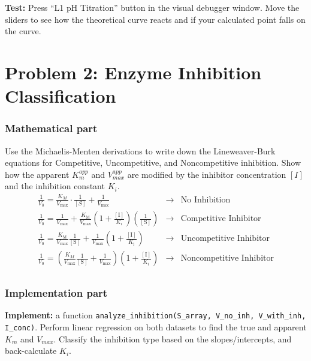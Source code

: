 \documentclass[11pt]{article}
\begin{document}
\textbf{Test:} Press ``L1 pH Titration'' button in the visual debugger window. Move the sliders to see how the theoretical curve reacts and if your calculated point falls on the curve.

\section*{Problem 2: Enzyme Inhibition Classification}

\subsubsection*{Mathematical part}
Use the Michaelis-Menten derivations to write down the Lineweaver-Burk equations for Competitive, Uncompetitive, and Noncompetitive inhibition. Show how the apparent $K_m^{app}$ and $V_{max}^{app}$ are modified by the inhibitor concentration $[I]$ and the inhibition constant $K_i$.
$$
\begin{aligned}
\frac{1}{V_0} = \frac{K_M}{V_{\text{max}}} \cdot \frac{1}{[S]} + \frac{1}{V_{\text{max}}} & \rightarrow & \text{No Inhibition}\\
\frac{1}{V_0} = \frac{1}{V_{\text{max}}} + \frac{K_{\text{M}}}{V_{\text{max}}} \left( 1 + \frac{[\text{I}]}{K_i} \right) \left( \frac{1}{[\text{S}]} \right) & \rightarrow & \text{Competitive Inhibitor}\\
\frac{1}{V_0} = \frac{K_{\text{M}}}{V_{\text{max}}} \frac{1}{[\text{S}]} + \frac{1}{V_{\text{max}}} \left( 1 + \frac{[\text{I}]}{K_{\text{i}}} \right) & \rightarrow & \text{Uncompetitive Inhibitor}\\
\frac{1}{V_0} = \left( \frac{K_M}{V_{\max}} \frac{1}{[\text{S}]} + \frac{1}{V_{\max}}\right) \left(1 + \frac{[\text{I}]}{K_i}\right) & \rightarrow & \text{Noncompetitive Inhibitor}\\
\end{aligned}
$$

\subsubsection*{Implementation part}
\textbf{Implement:} a function \lstinline|analyze_inhibition(S_array, V_no_inh, V_with_inh, I_conc)|. Perform linear regression on both datasets to find the true and apparent $K_m$ and $V_{max}$. Classify the inhibition type based on the slopes/intercepts, and back-calculate $K_i$.
\end{document}
